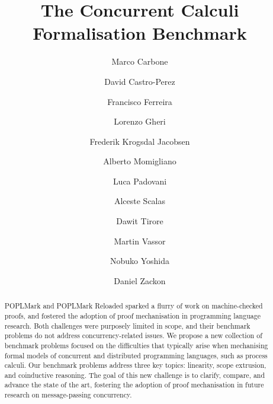 \documentclass[runningheads]{llncs}
\begin{document}
\title{The Concurrent Calculi Formalisation Benchmark}

\author{
     Marco Carbone 
\and David Castro-Perez 
\and Francisco Ferreira 
\and Lorenzo Gheri 
\and Frederik Krogsdal Jacobsen 
\and Alberto Momigliano 
\and Luca Padovani 
\and Alceste Scalas 
\and Dawit Tirore 
\and Martin Vassor 
\and Nobuko Yoshida 
\and Daniel Zackon 
}



\maketitle

\begin{abstract}
  POPLMark and POPLMark Reloaded sparked a flurry of work on machine-checked proofs, and fostered the adoption of proof mechanisation in programming language research.
  Both challenges were purposely limited in scope, and their benchmark problems do not address concurrency-related issues.
  We propose a new collection of benchmark problems focused on the difficulties that typically arise when mechanising formal models of concurrent and distributed programming languages, such as process calculi.
  Our benchmark problems address three key topics: linearity, scope extrusion, and coinductive reasoning.
  The goal of this new challenge is to clarify, compare, and advance the state of the art, fostering the adoption of proof mechanisation in future research on message-passing concurrency.

\end{abstract}
\end{document}
